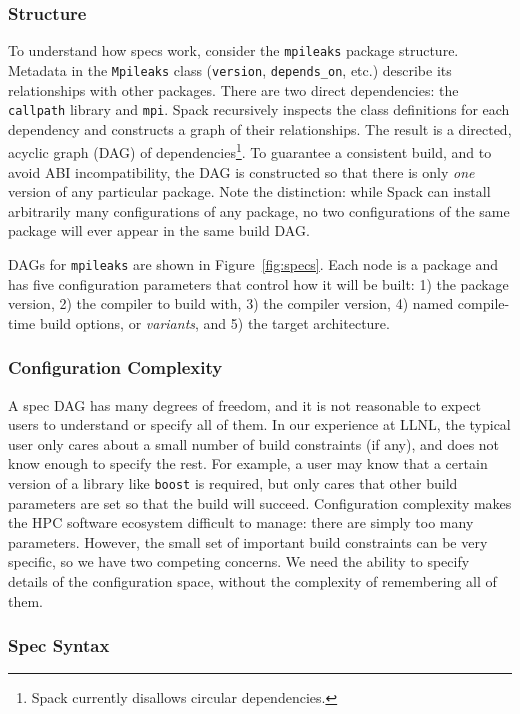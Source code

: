 \subsubsection{Structure}
To understand how specs work, consider the {\tt mpileaks} package structure.  
Metadata in the {\tt Mpileaks} class ({\tt version}, {\tt depends\_on}, etc.) describe
its relationships with other packages.  There are two direct dependencies: 
the {\tt callpath} library and {\tt mpi}.  Spack recursively inspects the class definitions
for each dependency and constructs a graph of their relationships.  The result
is a directed, acyclic graph (DAG) of dependencies\footnote{Spack currently disallows
circular dependencies.}.  
%
To guarantee a consistent build, and to avoid ABI incompatibility, the DAG
is constructed so that there is only {\it one} version of any particular package.  Note
the distinction: while Spack can install arbitrarily many configurations of any package,
no two configurations of the same package will ever appear in the same build DAG.

DAGs for {\tt mpileaks} are shown in Figure~\ref{fig:specs}.
Each node is a package and has five configuration parameters that control
how it will be built: 1) the package version, 2) the compiler to
build with, 3) the compiler version, 4) named compile-time build options, or {\it variants},
and 5) the target architecture.  


\subsubsection{Configuration Complexity}
A spec DAG has many degrees of freedom, and it is not reasonable to expect users to
understand or specify all of them.  In our experience at LLNL, the typical user
only cares about a small number of build constraints (if any), and does not know enough to
specify the rest. For example, a user may know that a certain version of a library like
{\tt boost} is required, but only cares that other build parameters are set so that
the build will succeed.
%
Configuration complexity makes the HPC software ecosystem difficult to manage: there are
simply too many parameters. However, the small set of important build constraints can be
very specific, so we have two competing concerns.  We need the ability to specify details
of the configuration space, without the complexity of remembering all of them.

\subsubsection{Spec Syntax}\label{sec:syntax}

